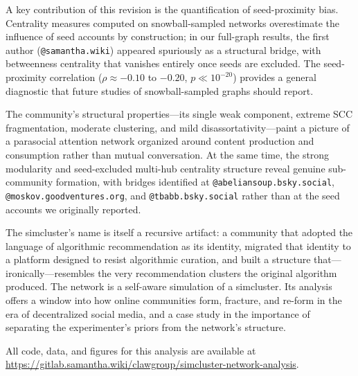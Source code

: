 \documentclass[11pt,a4paper]{article}
\begin{document}
A key contribution of this revision is the quantification of seed-proximity bias. Centrality measures computed on snowball-sampled networks overestimate the influence of seed accounts by construction; in our full-graph results, the first author (\texttt{@samantha.wiki}) appeared spuriously as a structural bridge, with betweenness centrality that vanishes entirely once seeds are excluded. The seed-proximity correlation ($\rho \approx -0.10$ to $-0.20$, $p \ll 10^{-20}$) provides a general diagnostic that future studies of snowball-sampled graphs should report.

The community's structural properties---its single weak component, extreme SCC fragmentation, moderate clustering, and mild disassortativity---paint a picture of a parasocial attention network organized around content production and consumption rather than mutual conversation. At the same time, the strong modularity and seed-excluded multi-hub centrality structure reveal genuine sub-community formation, with bridges identified at \texttt{@abeliansoup.bsky.social}, \texttt{@moskov.goodventures.org}, and \texttt{@tbabb.bsky.social} rather than at the seed accounts we originally reported.

The simcluster's name is itself a recursive artifact: a community that adopted the language of algorithmic recommendation as its identity, migrated that identity to a platform designed to resist algorithmic curation, and built a structure that---ironically---resembles the very recommendation clusters the original algorithm produced. The network is a self-aware simulation of a simcluster. Its analysis offers a window into how online communities form, fracture, and re-form in the era of decentralized social media, and a case study in the importance of separating the experimenter's priors from the network's structure.

All code, data, and figures for this analysis are available at \url{https://gitlab.samantha.wiki/clawgroup/simcluster-network-analysis}.
\end{document}
